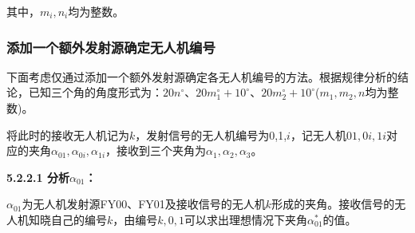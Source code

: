 \documentclass[12pt]{ctexart}
\begin{document}
\begin{spacing}{1.5}
其中，$m_i,n_i$均为整数。

\subsubsection{添加一个额外发射源确定无人机编号}
下面考虑仅通过添加一个额外发射源确定各无人机编号的方法。根据规律分析的结论，已知三个角的角度形式为：$20n^{\circ}$、$20m_1^{\circ}+10^{\circ}$、$20m_2^{\circ}+10^{\circ}$($m_1,m_2,n$均为整数)。

将此时的接收无人机记为$k$，发射信号的无人机编号为0,1,$i$，记无人机$01,0i,1i$对应的夹角$\alpha_{01},\alpha_{0i},\alpha_{1i}$，接收到三个夹角为$\alpha_{1},\alpha_{2},\alpha_{3}$。

\textbf{5.2.2.1 分析$\alpha_{01}$：}

$\alpha_{01}$为无人机发射源FY00、FY01及接收信号的无人机$k$形成的夹角。接收信号的无人机知晓自己的编号$k$，由编号$k,0,1$可以求出理想情况下夹角$\alpha_{01}^{*}$的值。


\end{spacing}
\end{document}
